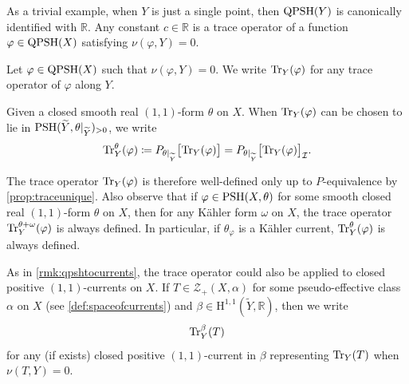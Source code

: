 \begin{example}
    As a trivial example, when $Y$ is just a single point, then $\mathrm{QPSH}(Y)$ is canonically identified with $\mathbb{R}$. Any constant $c\in \mathbb{R}$ is a trace operator of a function $\varphi\in \mathrm{QPSH}(X)$ satisfying $\nu(\varphi,Y)=0$.
\end{example}

\begin{definition}\label{def:traceop2}
    Let $\varphi\in \mathrm{QPSH}(X)$ such that $\nu(\varphi,Y)=0$. We write $\operatorname{Tr}_{Y}(\varphi)$ for any trace operator of $\varphi$ along $Y$.

    Given a closed smooth real $(1,1)$-form $\theta$ on $X$. When $\operatorname{Tr}_Y(\varphi)$ can be chosen to lie in $\mathrm{PSH}(\widetilde{Y},\theta|_{\widetilde{Y}})_{>0}$, we write
    \[
        \operatorname{Tr}_Y^{\theta}(\varphi)\coloneqq P_{\theta|_{\widetilde{Y}}}\bigl[ \operatorname{Tr}_Y(\varphi) \bigr]=P_{\theta|_{\widetilde{Y}}}\bigl[ \operatorname{Tr}_Y(\varphi) \bigr]_{\mathcal{I}}.
    \]
\end{definition}
The trace operator $\operatorname{Tr}_Y(\varphi)$ is therefore well-defined only up to $P$-equivalence by \cref{prop:traceunique}. Also observe that if $\varphi\in \mathrm{PSH}(X,\theta)$ for some smooth closed real $(1,1)$-form $\theta$ on $X$, then for any K\"ahler form $\omega$ on $X$, the trace operator $\operatorname{Tr}_Y^{\theta+\omega}(\varphi)$ is always defined. In particular, if $\theta_{\varphi}$ is a Kähler current, $\operatorname{Tr}^{\theta}_Y(\varphi)$ is always defined.


\begin{remark}\label{rmk:tracecurrent}
    As in \cref{rmk:qpshtocurrents}, the trace operator could also be applied to closed positive $(1,1)$-currents on $X$. If $T\in \mathcal{Z}_+(X,\alpha)$ for some pseudo-effective class $\alpha$ on $X$ (see \cref{def:spaceofcurrents}) and $\beta\in \mathrm{H}^{1,1}(\widetilde{Y},\mathbb{R})$, then we write
    \[
    \operatorname{Tr}^{\beta}_Y(T)
    \]
    for any (if exists) closed positive $(1,1)$-current in $\beta$ representing $\operatorname{Tr}_Y(T)$ when $\nu(T,Y)=0$.
\end{remark}




